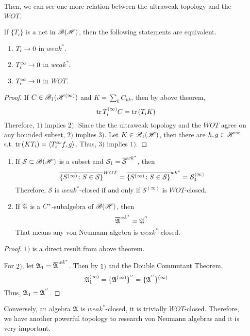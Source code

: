 \documentclass[a4paper,11pt]{report}
\begin{document}
Then, we can see one more relation between the ultraweak topology and the $WOT$.

\begin{thm}
	If $\{T_i\}$ is a net in $\mathscr{B(H)}$, then the following statements are equivalent.
	\begin{enumerate}[label = \arabic*)]
		\item $T_i \rightarrow 0$ in $weak^{*}$.
		\item $T_i^{\infty} \rightarrow 0$ in $weak^{*}$.
		\item $T_i^{\infty} \rightarrow 0$ in $WOT$.
	\end{enumerate}
\end{thm}
\begin{proof}
	If $C \in \mathscr{B}_1(\mathscr{H}^{(\infty)})$ and $K = \sum_k C_{kk}$, then by above theorem,
	\begin{equation*}
		\operatorname{tr}{T_i^{(\infty)}C} = \operatorname{tr}{(T_iK)}
	\end{equation*}
 	Therefore, $1)$ implies $2)$. Since the the ultraweak topology and the $WOT$ agree on any bounded subset, $2)$ implies $3)$. Let $K \in \mathscr{B}_{1}\mathscr{(H)}$, then there are $h,g \in \mathscr{H}^{\infty}$ s.t. $\operatorname{tr}{(KT_i)} = \langle T_i^{\infty}f,g \rangle$. Thus, $3)$ implies $1)$.
\end{proof}

\begin{cor}
	\begin{enumerate}[label=\arabic*)]
		\item If $\mathcal{S} \subset \mathscr{B(H)}$ is a subset and $\mathcal{S}_1 = \overline{\mathcal{S}}^{wk^{*}}$, then 
		\begin{equation*}
			\overline{\{S^{(\infty)} \colon S \in \mathcal{S}\}}^{WOT} = \overline{\{S^{(\infty)} \colon S \in \mathcal{S}\}}^{wk^{*}} = \mathcal{S}_1^{(\infty)}
		\end{equation*}
		Therefore, $\mathcal{S}$ is $weak^{*}$-closed if and only if $\mathcal{S}^{(\infty)}$ is $WOT$-closed.
		\item If $\mathfrak{A}$ is a $C^{*}$-subalgebra of $\mathscr{B(H)}$, then
		\begin{equation*}
			\overline{\mathfrak{A}}^{wk^{*}} = \mathfrak{A}^{''}
		\end{equation*}
		That means any von Neumann algebra is $weak^{*}$-closed.
	\end{enumerate}
\end{cor}
\begin{proof}
	$1)$ is a direct result from above theorem.
	\item For $2)$, let $\mathfrak{A}_1 = \overline{\mathfrak{A}}^{wk^{*}}$. Then by $1)$ and the Double Commutant Theorem,
	\begin{equation*}
		\mathfrak{A}_1^{(\infty)} = \{\mathfrak{A}^{(\infty)}\}^{''} = \{\mathfrak{A}^{''}\}^{(\infty)}
	\end{equation*}
	Thus, $\mathfrak{A}_1 = \mathfrak{A}^{''} $.
\end{proof}
\begin{rem}
	Conversely, an algebra $\mathfrak{A}$ is $weak^{*}$-closed, it is trivially $WOT$-closed. Therefore, we have another powerful topology to research von Neumann algebras and it is very important.
\end{rem}
\end{document}
